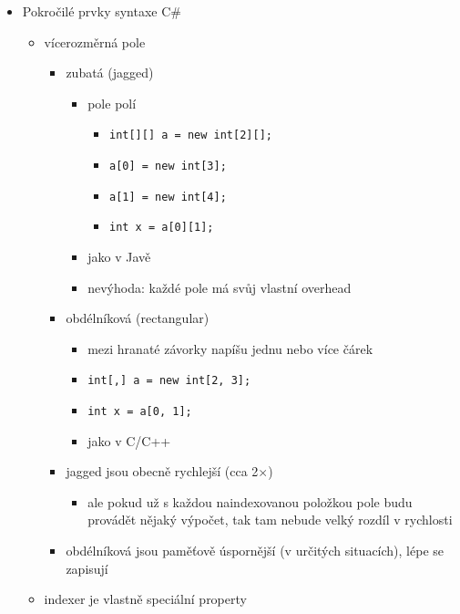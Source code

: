 \begin{itemize}
\item Pokročilé prvky syntaxe C\#
\begin{itemize}
\item vícerozměrná pole
\begin{itemize}
\item zubatá (jagged)
\begin{itemize}
\item pole polí
\begin{itemize}
\item \texttt{int[][] \allowbreak{}a \allowbreak{}= \allowbreak{}new \allowbreak{}int[2][];\allowbreak{}}
\item \texttt{a[0] \allowbreak{}= \allowbreak{}new \allowbreak{}int[3];\allowbreak{}}
\item \texttt{a[1] \allowbreak{}= \allowbreak{}new \allowbreak{}int[4];\allowbreak{}}
\item \texttt{int \allowbreak{}x \allowbreak{}= \allowbreak{}a[0][1];\allowbreak{}}
\end{itemize}
\item jako v Javě
\item nevýhoda: každé pole má svůj vlastní overhead
\end{itemize}
\item obdélníková (rectangular)
\begin{itemize}
\item mezi hranaté závorky napíšu jednu nebo více čárek
\item \texttt{int[,\allowbreak{}] \allowbreak{}a \allowbreak{}= \allowbreak{}new \allowbreak{}int[2,\allowbreak{} \allowbreak{}3];\allowbreak{}}
\item \texttt{int \allowbreak{}x \allowbreak{}= \allowbreak{}a[0,\allowbreak{} \allowbreak{}1];\allowbreak{}}
\item jako v C/C++
\end{itemize}
\item jagged jsou obecně rychlejší (cca 2$\times$)
\begin{itemize}
\item ale pokud už s každou naindexovanou položkou pole budu provádět nějaký výpočet, tak tam nebude velký rozdíl v rychlosti
\end{itemize}
\item obdélníková jsou paměťově úspornější (v určitých situacích), lépe se zapisují
\end{itemize}
\item indexer je vlastně speciální property
\begin{itemize}

\end{itemize}
\end{itemize}
\end{itemize}
